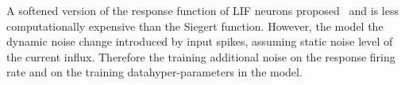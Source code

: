	A softened version of the response function of LIF neurons \DIFdelbegin {}\DIFdelend \DIFaddbegin {}\DIFaddend proposed~\citep{hunsberger2015spiking} and is less computationally expensive than the Siegert function.
	However, the model \DIFdelbegin {}\DIFdelend \DIFaddbegin {}\DIFaddend the dynamic noise change introduced by input spikes, assuming \DIFaddbegin {}\DIFaddend static noise level of the current influx.
	Therefore the training \DIFdelbegin {}\DIFdelend \DIFaddbegin {}\DIFaddend additional noise on the response firing rate and on the training data\DIFdelbegin {}\DIFdelend \DIFaddbegin {}\DIFaddend hyper-parameters in the model.

